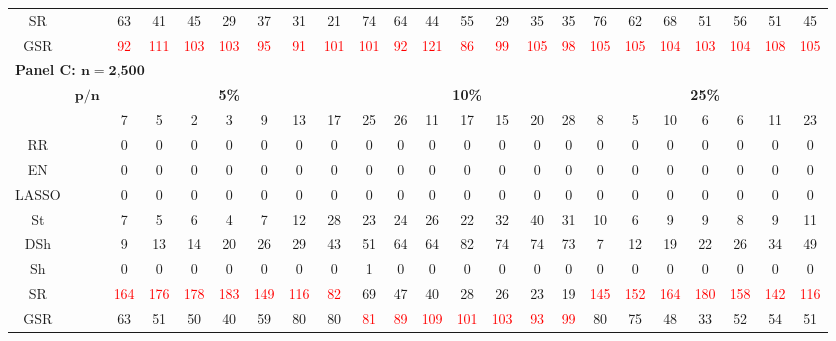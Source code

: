 \begin{table}
{\begin{tabular*}{\textwidth}{@{\extracolsep{\fill}}cc|ccccccc|ccccccc|ccccccc@{}}
SR &  & 63 & 41 & 45 & 29 & 37 & 31 & 21 & 74 & 64 & 44 & 55 & 29 & 35 & 35 & 76 & 62 & 68 & 51 & 56 & 51 & 45 \\
GSR &  & \textcolor{red}{92} & \textcolor{red}{111} & \textcolor{red}{103} & \textcolor{red}{103} & \textcolor{red}{95} & \textcolor{red}{91} & \textcolor{red}{101} & \textcolor{red}{101} & \textcolor{red}{92} & \textcolor{red}{121} & \textcolor{red}{86} & \textcolor{red}{99} & \textcolor{red}{105} & \textcolor{red}{98} & \textcolor{red}{105} & \textcolor{red}{105} & \textcolor{red}{104} & \textcolor{red}{103} & \textcolor{red}{104} & \textcolor{red}{108} & \textcolor{red}{105} \\
\hline
\multicolumn{23}{l}{\textbf{Panel C: $\bm{n}=\textbf{2,500}$}} \\
\hline
\multirow{2}{*}{} & $\bm{p/n}$ & \multicolumn{7}{c|}{\textbf{5\%}} & \multicolumn{7}{c|}{\textbf{10\%}} & \multicolumn{7}{c}{\textbf{25\%}} \\
\hline
OLS &  & 7 & 5 & 2 & 3 & 9 & 13 & 17 & 25 & 26 & 11 & 17 & 15 & 20 & 28 & 8 & 5 & 10 & 6 & 6 & 11 & 23 \\
RR &  & 0 & 0 & 0 & 0 & 0 & 0 & 0 & 0 & 0 & 0 & 0 & 0 & 0 & 0 & 0 & 0 & 0 & 0 & 0 & 0 & 0 \\
EN &  & 0 & 0 & 0 & 0 & 0 & 0 & 0 & 0 & 0 & 0 & 0 & 0 & 0 & 0 & 0 & 0 & 0 & 0 & 0 & 0 & 0 \\
LASSO &  & 0 & 0 & 0 & 0 & 0 & 0 & 0 & 0 & 0 & 0 & 0 & 0 & 0 & 0 & 0 & 0 & 0 & 0 & 0 & 0 & 0 \\
St &  & 7 & 5 & 6 & 4 & 7 & 12 & 28 & 23 & 24 & 26 & 22 & 32 & 40 & 31 & 10 & 6 & 9 & 9 & 8 & 9 & 11 \\
DSh &  & 9 & 13 & 14 & 20 & 26 & 29 & 43 & 51 & 64 & 64 & 82 & 74 & 74 & 73 & 7 & 12 & 19 & 22 & 26 & 34 & 49 \\
Sh &  & 0 & 0 & 0 & 0 & 0 & 0 & 0 & 1 & 0 & 0 & 0 & 0 & 0 & 0 & 0 & 0 & 0 & 0 & 0 & 0 & 0 \\
SR &  & \textcolor{red}{164} & \textcolor{red}{176} & \textcolor{red}{178} & \textcolor{red}{183} & \textcolor{red}{149} & \textcolor{red}{116} & \textcolor{red}{82} & 69 & 47 & 40 & 28 & 26 & 23 & 19 & \textcolor{red}{145} & \textcolor{red}{152} & \textcolor{red}{164} & \textcolor{red}{180} & \textcolor{red}{158} & \textcolor{red}{142} & \textcolor{red}{116} \\
GSR &  & 63 & 51 & 50 & 40 & 59 & 80 & 80 & \textcolor{red}{81} & \textcolor{red}{89} & \textcolor{red}{109} & \textcolor{red}{101} & \textcolor{red}{103} & \textcolor{red}{93} & \textcolor{red}{99} & 80 & 75 & 48 & 33 & 52 & 54 & 51 \\

\end{tabular*}}
\end{table}
